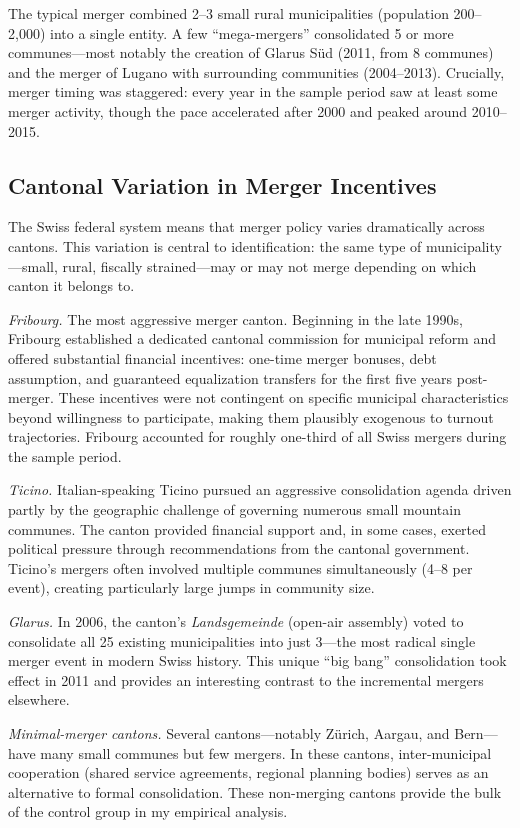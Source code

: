 \documentclass[12pt]{article}
\begin{document}
The typical merger combined 2--3 small rural municipalities (population 200--2,000) into a single entity. A few ``mega-mergers'' consolidated 5 or more communes---most notably the creation of Glarus S\"ud (2011, from 8 communes) and the merger of Lugano with surrounding communities (2004--2013). Crucially, merger timing was staggered: every year in the sample period saw at least some merger activity, though the pace accelerated after 2000 and peaked around 2010--2015.

\subsection{Cantonal Variation in Merger Incentives}

The Swiss federal system means that merger policy varies dramatically across cantons. This variation is central to identification: the same type of municipality---small, rural, fiscally strained---may or may not merge depending on which canton it belongs to.

\textit{Fribourg.} The most aggressive merger canton. Beginning in the late 1990s, Fribourg established a dedicated cantonal commission for municipal reform and offered substantial financial incentives: one-time merger bonuses, debt assumption, and guaranteed equalization transfers for the first five years post-merger. These incentives were not contingent on specific municipal characteristics beyond willingness to participate, making them plausibly exogenous to turnout trajectories. Fribourg accounted for roughly one-third of all Swiss mergers during the sample period.

\textit{Ticino.} Italian-speaking Ticino pursued an aggressive consolidation agenda driven partly by the geographic challenge of governing numerous small mountain communes. The canton provided financial support and, in some cases, exerted political pressure through recommendations from the cantonal government. Ticino's mergers often involved multiple communes simultaneously (4--8 per event), creating particularly large jumps in community size.

\textit{Glarus.} In 2006, the canton's \textit{Landsgemeinde} (open-air assembly) voted to consolidate all 25 existing municipalities into just 3---the most radical single merger event in modern Swiss history. This unique ``big bang'' consolidation took effect in 2011 and provides an interesting contrast to the incremental mergers elsewhere.

\textit{Minimal-merger cantons.} Several cantons---notably Z\"urich, Aargau, and Bern---have many small communes but few mergers. In these cantons, inter-municipal cooperation (shared service agreements, regional planning bodies) serves as an alternative to formal consolidation. These non-merging cantons provide the bulk of the control group in my empirical analysis.
\end{document}
